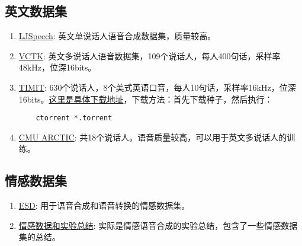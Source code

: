 \documentclass[cn,10pt,math=newtx,citestyle=gb7714-2015,bibstyle=gb7714-2015]{elegantbook}
\begin{document}
\subsection{英文数据集}
\begin{enumerate}
  \item \href{https://keithito.com/LJ-Speech-Dataset/}{LJSpeech}: 英文单说话人语音合成数据集，质量较高。
  \item \href{https://datashare.is.ed.ac.uk/handle/10283/2651}{VCTK}: 英文多说话人语音数据集，109个说话人，每人400句话，采样率48kHz，位深16bits。
  \item \href{https://catalog.ldc.upenn.edu/LDC93S1}{TIMIT}: 630个说话人，8个美式英语口音，每人10句话，采样率16kHz，位深16bits。\href{http://academictorrents.com/details/34e2b78745138186976cbc27939b1b34d18bd5b3}{这里是具体下载地址}，下载方法：首先下载种子，然后执行：
  \begin{lstlisting}
    ctorrent *.torrent
  \end{lstlisting}

  \item \href{http://festvox.org/cmu_arctic/packed/}{CMU ARCTIC}: 共18个说话人。语音质量较高，可以用于英文多说话人的训练。

\end{enumerate}

\subsection{情感数据集}
\begin{enumerate}
  \item \href{https://github.com/HLTSingapore/Emotional-Speech-Data}{ESD}: 用于语音合成和语音转换的情感数据集。
  \item \href{https://github.com/Emotional-Text-to-Speech/dl-for-emo-tts}{情感数据和实验总结}: 实际是情感语音合成的实验总结，包含了一些情感数据集的总结。
\end{enumerate}
\end{document}
